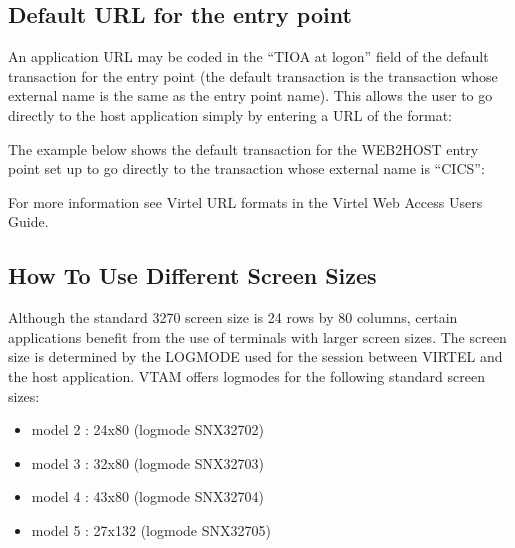 \documentclass[letterpaper,10pt,english]{sphinxmanual}
\begin{document}
\subsection{Default URL for the entry point}
\label{\detokenize{Customization:default-url-for-the-entry-point}}\label{\detokenize{Customization:index-65}}
An application URL may be coded in the “TIOA at logon” field of the default transaction for the entry point (the default transaction is the transaction whose external name is the same as the entry point name). This allows the user to go directly to the host application simply by entering a URL of the format:

\begin{sphinxVerbatim}[commandchars=\\\{\}]
\end{sphinxVerbatim}

The example below shows the default transaction for the WEB2HOST entry point set up to go directly to the transaction whose external name is “CICS”:



For more information see Virtel URL formats in the Virtel Web Access Users Guide.

\ignorespaces 

\subsection{How To Use Different Screen Sizes}
\label{\detokenize{Customization:how-to-use-different-screen-sizes}}\label{\detokenize{Customization:index-66}}
Although the standard 3270 screen size is 24 rows by 80 columns, certain applications benefit from the use of terminals with larger screen sizes. The screen size is determined by the LOGMODE used for the session between VIRTEL and the host application. VTAM offers logmodes for the following standard screen sizes:
\begin{itemize}
\item {} 
model 2 : 24x80 (logmode SNX32702)

\item {} 
model 3 : 32x80 (logmode SNX32703)

\item {} 
model 4 : 43x80 (logmode SNX32704)

\item {} 
model 5 : 27x132 (logmode SNX32705)

\end{itemize}
\end{document}
